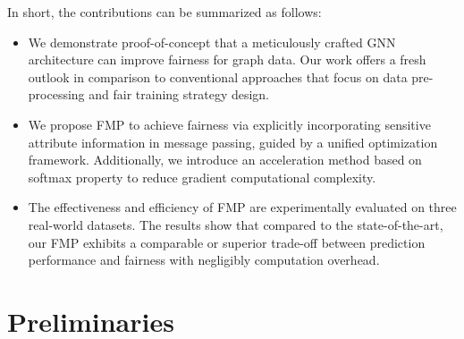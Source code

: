 \documentclass[letterpaper]{article} %
\theoremstyle{plain}
\theoremstyle{definition}
\theoremstyle{remark}
\begin{document}
In short, the contributions can be summarized as follows:
\begin{itemize}[leftmargin=0.6cm, itemindent=.0cm, itemsep=0.0cm, topsep=0.0cm]
    \item We demonstrate proof-of-concept that a meticulously crafted GNN architecture can improve fairness for graph data. Our work offers a fresh outlook in comparison to conventional approaches that focus on data pre-processing and fair training strategy design.

    \item We propose FMP to achieve fairness via explicitly incorporating sensitive attribute information in message passing, guided by a unified optimization framework. Additionally, we introduce an acceleration method based on softmax property to reduce gradient computational complexity.
    \item  The effectiveness and efficiency of FMP are experimentally evaluated on three real-world datasets. The results show that compared to the state-of-the-art, our FMP exhibits a comparable or superior trade-off between prediction performance and fairness with negligibly computation overhead.
\end{itemize}


\section{Preliminaries}
\end{document}
